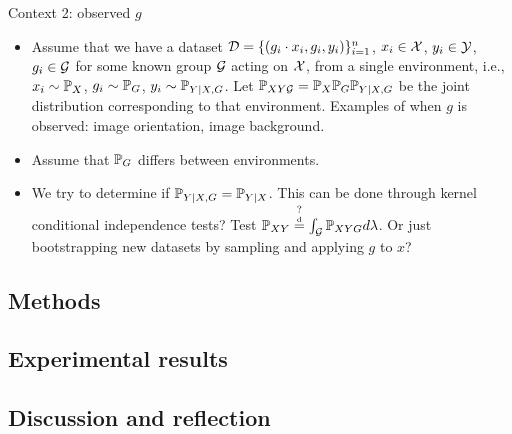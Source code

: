 Context 2: observed $g$

\begin{itemize}

\item
Assume that we have a dataset $\mathcal{D}=\{(g_i\cdot x_i,g_i,y_i)\}_{i=1}^n$, $x_i\in\mathcal{X}$, $y_i\in\mathcal{Y}$, $g_i\in\mathcal{G}$ for some known group $\mathcal{G}$ acting on $\mathcal{X}$, from a single environment, i.e., $x_i\sim\mathbb{P}_X$, $g_i\sim\mathbb{P}_G$, $y_i\sim\mathbb{P}_{Y|X,G}$. Let $\mathbb{P}_{XY\mathcal{G}}=\mathbb{P}_X\mathbb{P}_G\mathbb{P}_{Y|X,G}$ be the joint distribution corresponding to that environment. Examples of when $g$ is observed: image orientation, image background.

\item
Assume that $\mathbb{P}_G$ differs between environments.

\item
We try to determine if $\mathbb{P}_{Y|X,G}=\mathbb{P}_{Y|X}$. \todo This can be done through kernel conditional independence tests? Test $\mathbb{P}_{XY}\overset{?}{\stackrel{\text{\rm\tiny d}}{=}}\int_{\mathcal{G}} \mathbb{P}_{XYG}d\lambda$. \todo Or just bootstrapping new datasets by sampling and applying $g$ to $x$?

\end{itemize}

\subsection{\todo Methods}

\subsection{\todo Experimental results}

\subsection{Discussion and reflection}